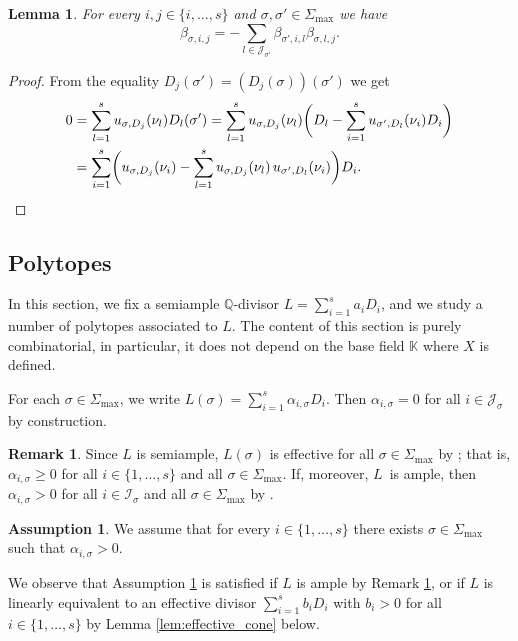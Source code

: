 \documentclass[JEP,XML,SOM,Unicode,published]{cedram}
\newcommand\QQ{\mathbb{Q}}
\newcommand{\KK}{\mathbb{K}}
\newcommand{\gen}[1]{\nu_{#1}}
\newcommand{\ii}[1]{\mathcal{J}_{#1}}
\newcommand{\ic}[1]{\mathcal{I}_{#1}}
\newtheorem{lemma}[theorem]{Lemma}
\theoremstyle{definition}
\newtheorem{remark}[theorem]{Remark}
\newtheorem{assumption}[theorem]{Assumption}
\numberwithin{theorem}{section}
\begin{document}
\begin{lemma}
\label{lem:relation_beta_sigma_sigma'}
For every $i,j\in\{i,\dots,s\}$ and $\sigma,\sigma'\in\Sigma_{\max}$ we have
\[
\beta_{\sigma, i,j}
=-\sum_{l\in \ii{\sigma'}}\beta_{\sigma', i, l}\beta_{\sigma, l, j}.
\]
\end{lemma}
\begin{proof}
From the equality $D_{j}(\sigma')=(D_{j}(\sigma))(\sigma')$
we get
\begin{align*}
0&= \sum_{l=1}^s u_{\sigma,D_{j}}(\gen{l})D_{l}(\sigma')
= \sum_{l=1}^s u_{\sigma,D_{j}}(\gen{l})\biggl(D_{l}-\sum_{i=1}^s u_{\sigma',D_{l}}(\gen{i})D_i\biggr)\\
&=\sum_{i=1}^s\biggl(u_{\sigma,D_{j}}(\gen{i})
- \sum_{l=1}^s u_{\sigma,D_{j}}(\gen{l})\, u_{\sigma',D_{l}}(\gen{i})\biggr)D_i.
\qedhere
\end{align*}
\end{proof}

\subsection{Polytopes}
\label{sec:polytopes_toric}

In this section, we fix a semiample $\QQ$-divisor $L=\sum_{i=1}^s a_i D_i$,
and we study a number of polytopes associated to $L$.
The content of this section is purely combinatorial,
in particular, it does not depend on the base field $\KK$ where $X$ is defined.

For each $\sigma\in\Sigma_{\max}$, we write $L(\sigma)=\sum_{i=1}^s\alpha_{i, \sigma}D_i$.
Then $\alpha_{i,\sigma}=0$ for all $i\in\ii{\sigma}$ by construction.
\begin{remark}
\label{rem:basepointfree_L(sigma)}
Since $L$ is semiample, $L(\sigma)$ is effective for all $\sigma\in\Sigma_{\max}$
by \cite[Prop.\,6.1.1]{MR2810322}; that is, $\alpha_{i,\sigma}\geq0$ for all
$i\in\{1,\dots,s\}$ and all $\sigma\in\Sigma_{\max}$.
If, moreover, $L$~is ample, then $\alpha_{i,\sigma}>0$ for all $i\in\ic{\sigma}$ and
all $\sigma\in\Sigma_{\max}$ by \cite[Th.\,6.1.14]{MR2810322}.
\end{remark}

\begin{assumption}
\label{assp:L}
We assume that for every $i\in\{1,\dots,s\}$ there exists $\sigma\in\Sigma_{\max}$
such that $\alpha_{i,\sigma}>0$.
\end{assumption}

We observe that Assumption \ref{assp:L} is satisfied
if $L$ is ample by Remark \ref{rem:basepointfree_L(sigma)},
or if $L$ is linearly equivalent to an effective divisor
$\sum_{i=1}^s b_i D_i$ with $b_i>0$ for all $i\in\{1,\dots,s\}$
by Lemma \ref{lem:effective_cone} below.
\end{document}
